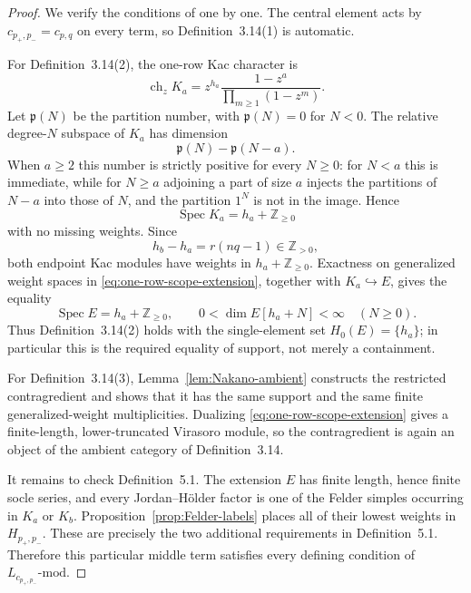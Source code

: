 \documentclass[12pt,leqno]{amsart}
\numberwithin{equation}{section}
\newcommand{\ch}{\operatorname{ch}}
\def\Z{\mathbb{Z}}
\begin{document}
\begin{proof}
We verify the conditions of \cite[Definitions~3.14 and~5.1]{Nakano}
one by one.  The central element acts by $c_{p_+,p_-}=c_{p,q}$ on every
term, so Definition~3.14(1) is automatic.

For Definition~3.14(2), the one-row Kac character is
\[
 \ch_zK_a=z^{h_a}
 \frac{1-z^a}{\prod_{m\ge1}(1-z^m)}.
\]
Let $\mathfrak p(N)$ be the partition number, with
$\mathfrak p(N)=0$ for $N<0$.  The relative degree-$N$ subspace of
$K_a$ has dimension
\[
 \mathfrak p(N)-\mathfrak p(N-a).
\]
When $a\ge2$ this number is strictly positive for every $N\ge0$: for
$N<a$ this is immediate, while for $N\ge a$ adjoining a part of size
$a$ injects the partitions of $N-a$ into those of $N$, and the partition
$1^N$ is not in the image.  Hence
\begin{equation}\label{eq:Ka-full-support}
 \operatorname{Spec}K_a=h_a+\Z_{\ge0}
\end{equation}
with no missing weights.  Since
\[
 h_b-h_a=r(nq-1)\in\Z_{>0},
\]
both endpoint Kac modules have weights in $h_a+\Z_{\ge0}$.  Exactness on
generalized weight spaces in \eqref{eq:one-row-scope-extension}, together
with $K_a\hookrightarrow E$, gives the equality
\[
 \operatorname{Spec}E=h_a+\Z_{\ge0},
 \qquad
 0<\dim E[h_a+N]<\infty\quad(N\ge0).
\]
Thus Definition~3.14(2) holds with the single-element set
$H_0(E)=\{h_a\}$; in particular this is the required equality of support,
not merely a containment.

For Definition~3.14(3), Lemma~\ref{lem:Nakano-ambient} constructs the
restricted contragredient and shows that it has the same support and the
same finite generalized-weight multiplicities.  Dualizing
\eqref{eq:one-row-scope-extension} gives a finite-length, lower-truncated
Virasoro module, so the contragredient is again an object of the ambient
category of Definition~3.14.

It remains to check Definition~5.1.  The extension $E$ has finite length,
hence finite socle series, and every Jordan--H\"older factor is one of the
Felder simples occurring in $K_a$ or $K_b$.  Proposition~\ref{prop:Felder-labels}
places all of their lowest weights in $H_{p_+,p_-}$.  These are precisely
the two additional requirements in Definition~5.1.  Therefore this
particular middle term satisfies every defining condition of
$L_{c_{p_+,p_-}}\text{-mod}$.
\end{proof}
\end{document}
